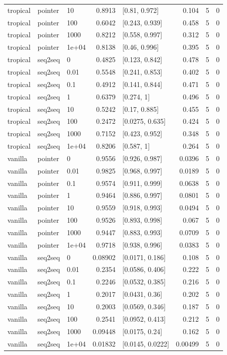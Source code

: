 \documentclass[10pt]{article}
\begin{document}
{\begin{longtable}{lllrlrrr}
tropical & pointer & 10 & 0.8913 & [0.81, 0.972] & 0.104 & 5 & 0\\
tropical & pointer & 100 & 0.6042 & [0.243, 0.939] & 0.458 & 5 & 0\\
tropical & pointer & 1000 & 0.8212 & [0.558, 0.997] & 0.312 & 5 & 0\\
tropical & pointer & 1e+04 & 0.8138 & [0.46, 0.996] & 0.395 & 5 & 0\\
tropical & seq2seq & 0 & 0.4825 & [0.123, 0.842] & 0.478 & 5 & 0\\
tropical & seq2seq & 0.01 & 0.5548 & [0.241, 0.853] & 0.402 & 5 & 0\\
tropical & seq2seq & 0.1 & 0.4912 & [0.141, 0.844] & 0.471 & 5 & 0\\
tropical & seq2seq & 1 & 0.6379 & [0.274, 1] & 0.496 & 5 & 0\\
tropical & seq2seq & 10 & 0.5242 & [0.17, 0.885] & 0.455 & 5 & 0\\
tropical & seq2seq & 100 & 0.2472 & [0.0275, 0.635] & 0.424 & 5 & 0\\
tropical & seq2seq & 1000 & 0.7152 & [0.423, 0.952] & 0.348 & 5 & 0\\
tropical & seq2seq & 1e+04 & 0.8206 & [0.587, 1] & 0.264 & 5 & 0\\
vanilla & pointer & 0 & 0.9556 & [0.926, 0.987] & 0.0396 & 5 & 0\\
vanilla & pointer & 0.01 & 0.9825 & [0.968, 0.997] & 0.0189 & 5 & 0\\
vanilla & pointer & 0.1 & 0.9574 & [0.911, 0.999] & 0.0638 & 5 & 0\\
vanilla & pointer & 1 & 0.9464 & [0.886, 0.997] & 0.0801 & 5 & 0\\
vanilla & pointer & 10 & 0.9559 & [0.918, 0.993] & 0.0494 & 5 & 0\\
vanilla & pointer & 100 & 0.9526 & [0.893, 0.998] & 0.067 & 5 & 0\\
vanilla & pointer & 1000 & 0.9447 & [0.883, 0.993] & 0.0709 & 5 & 0\\
vanilla & pointer & 1e+04 & 0.9718 & [0.938, 0.996] & 0.0383 & 5 & 0\\
vanilla & seq2seq & 0 & 0.08902 & [0.0171, 0.186] & 0.108 & 5 & 0\\
vanilla & seq2seq & 0.01 & 0.2354 & [0.0586, 0.406] & 0.222 & 5 & 0\\
vanilla & seq2seq & 0.1 & 0.2246 & [0.0532, 0.385] & 0.216 & 5 & 0\\
vanilla & seq2seq & 1 & 0.2017 & [0.0431, 0.36] & 0.202 & 5 & 0\\
vanilla & seq2seq & 10 & 0.2003 & [0.0569, 0.346] & 0.187 & 5 & 0\\
vanilla & seq2seq & 100 & 0.2541 & [0.0952, 0.413] & 0.212 & 5 & 0\\
vanilla & seq2seq & 1000 & 0.09448 & [0.0175, 0.24] & 0.162 & 5 & 0\\
vanilla & seq2seq & 1e+04 & 0.01832 & [0.0145, 0.0222] & 0.00499 & 5 & 0\\
\bottomrule
\end{longtable}
}
\end{document}
